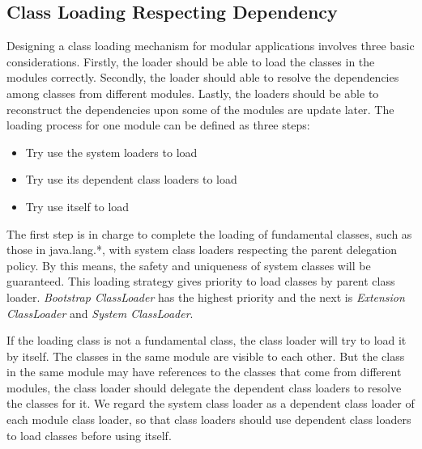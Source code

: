 \documentclass[conference]{IEEEtran}
\begin{document}
\subsection{Class Loading Respecting Dependency}

Designing a class loading mechanism for modular applications involves three basic considerations. Firstly, the loader should be able to load the classes in the modules correctly. Secondly, the loader should able to resolve the dependencies among classes from different modules. Lastly, the loaders should be able to reconstruct the dependencies upon some of the modules are update later. 
The loading process for one module can be defined as three steps:
\begin{itemize}
\item Try use the system loaders to load
\item Try use its dependent class loaders to load
\item Try use itself to load
\end{itemize}

The first step is in charge to complete the loading of fundamental classes, such as those in java.lang.*, with system class loaders respecting the parent delegation policy\cite{parent_delegation}. By this means, the safety and uniqueness of system classes will be guaranteed. This loading strategy gives priority to load classes by parent class loader. \emph{Bootstrap ClassLoader} has the highest priority and the next is \emph{Extension ClassLoader} and \emph{System ClassLoader}. 

If the loading class is not a fundamental class, the class loader will try to load it by itself. The classes in the same module are visible to each other. But the class in the same module may have references to the classes that come from different modules, the class loader should delegate the dependent class loaders to resolve the classes for it. We regard the system class loader as a dependent class loader of each module class loader, so that class loaders should use dependent class loaders to load classes before using itself.
\end{document}
